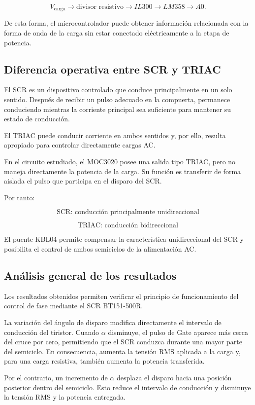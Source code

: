 \documentclass[12pt]{article}
\begin{document}
\[
V_{\mathrm{carga}}
\rightarrow
\text{divisor resistivo}
\rightarrow
IL300
\rightarrow
LM358
\rightarrow
A0.
\]

De esta forma, el microcontrolador puede obtener información relacionada
con la forma de onda de la carga sin estar conectado eléctricamente a la
etapa de potencia.

\subsection{Diferencia operativa entre SCR y TRIAC}

El SCR es un dispositivo controlado que conduce principalmente en un solo
sentido. Después de recibir un pulso adecuado en la compuerta, permanece
conduciendo mientras la corriente principal sea suficiente para mantener
su estado de conducción.

El TRIAC puede conducir corriente en ambos sentidos y, por ello, resulta
apropiado para controlar directamente cargas AC.

En el circuito estudiado, el MOC3020 posee una salida tipo TRIAC, pero no
maneja directamente la potencia de la carga. Su función es transferir de
forma aislada el pulso que participa en el disparo del SCR.

Por tanto:

\[
\boxed{\text{SCR: conducción principalmente unidireccional}}
\]

\[
\boxed{\text{TRIAC: conducción bidireccional}}
\]

El puente KBL04 permite compensar la característica unidireccional del SCR
y posibilita el control de ambos semiciclos de la alimentación AC.

\subsection{Análisis general de los resultados}

Los resultados obtenidos permiten verificar el principio de funcionamiento
del control de fase mediante el SCR BT151-500R.

La variación del ángulo de disparo modifica directamente el intervalo de
conducción del tiristor. Cuando $\alpha$ disminuye, el pulso de Gate aparece
más cerca del cruce por cero, permitiendo que el SCR conduzca durante una
mayor parte del semiciclo. En consecuencia, aumenta la tensión RMS aplicada
a la carga y, para una carga resistiva, también aumenta la potencia
transferida.

Por el contrario, un incremento de $\alpha$ desplaza el disparo hacia una
posición posterior dentro del semiciclo. Esto reduce el intervalo de
conducción y disminuye la tensión RMS y la potencia entregada.
\end{document}
